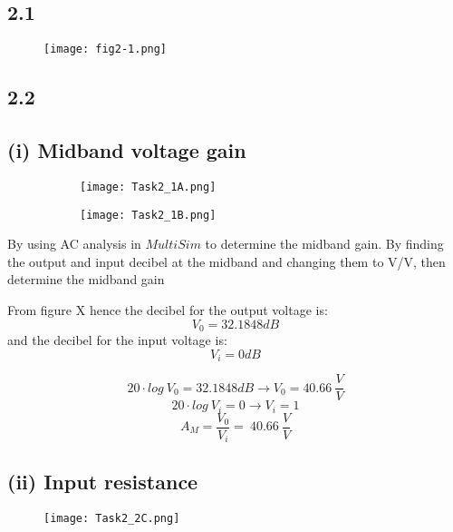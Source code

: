 \subsection*{2.1}
    \begin{figure}[h!]
        \centering
        \texttt{[image: fig2-1.png]}
    \end{figure}    

\subsection*{2.2}
  \subsection*{(i) Midband voltage gain}

	\begin{figure}[h]
        \centering
        \begin{subfigure}[h]{0.5\textwidth}
                \texttt{[image: Task2\_1A.png]}
                \label{fig:HJÖRLEIFUR}
        \end{subfigure}
        \begin{subfigure}[h]{0.2\textwidth}
                \texttt{[image: Task2\_1B.png]}
                \label{fig:LÁRUS}
        \end{subfigure}
	\end{figure}

    By using AC analysis in $MultiSim$ to determine the midband gain.
    By finding the output and input decibel at the midband and changing them to V/V, then determine the midband gain

   	From figure X hence the decibel for the output voltage is:
   	$$ V_{0} = 32.1848 dB $$ 
   	and the decibel for the input voltage is:
   	$$ V_{i} = 0 dB $$

   	$$ 20 \cdot log{\ V_{0} } = 32.1848 dB \rightarrow V_{0} = 40.66\  \frac{V}{V} $$
   	$$20 \cdot log{\ V_{i} } = 0  \rightarrow V_{i}= 1$$
   	$$A_{M} = \frac{V_{0}}{V_{i}} =\ 40.66 \ \frac{V}{V} $$


	\subsection*{(ii) Input resistance}
    \begin{figure}[h!]
        \centering
        \texttt{[image: Task2\_2C.png]}
    \end{figure}  

